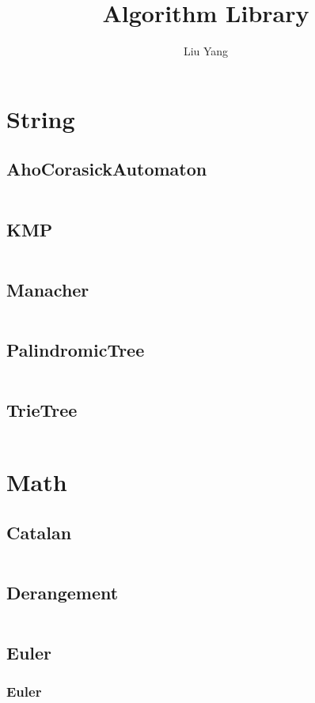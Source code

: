 \documentclass[a4paper,11pt]{article}
\author{Liu Yang}
\title{Algorithm Library}
\begin{document}
 
\maketitle
\newpage
\tableofcontents
\newpage

\section{String}
\subsection{AhoCorasickAutomaton}
\inputminted[breaklines]{c++}{01++String/+AhoCorasickAutomaton.cpp}
\subsection{KMP}
\inputminted[breaklines]{c++}{01++String/+KMP.cpp}
\subsection{Manacher}
\inputminted[breaklines]{c++}{01++String/+Manacher.cpp}
\subsection{PalindromicTree}
\inputminted[breaklines]{c++}{01++String/+PalindromicTree.cpp}
\subsection{TrieTree}
\inputminted[breaklines]{c++}{01++String/+TrieTree.cpp}

\newpage
\section{Math}
\subsection{Catalan}
\inputminted[breaklines]{c++}{02++Math/+Catalan.cpp}
\subsection{Derangement}
\inputminted[breaklines]{c++}{02++Math/+Derangement.cpp}
\subsection{Euler}
\subsubsection{Euler}
\inputminted[breaklines]{c++}{02++Math/+Euler/+Euler.cpp}
\end{document}
